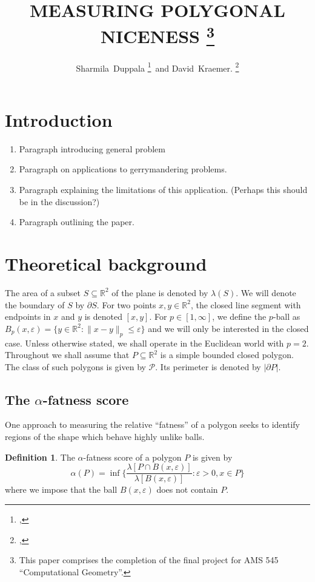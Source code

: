 \documentclass[draft]{jocg}
\title{%
  \MakeUppercase{Measuring polygonal niceness}%
  \thanks{%
    This paper comprises the completion of the final project for AMS 545
    ``Computational Geometry''.
  }
}
\author{%
  Sharmila~Duppala%
  \thanks{%
    \affil{Department of Computer Science}, 
    \email{sduppala@cs.stonybrook.edu}%
  }\, and
  David~Kraemer.%
  \thanks{%
    \affil{Department of Applied Mathematics},
    \email{david.kraemer@stonybrook.edu}%
  }
}
\newcommand{\RR}{\mathbb{R}}
\newcommand{\PP}{\mathcal{P}}
\newcommand{\set}[1]{\{#1\}}
\newcommand{\norm}[1]{\|#1\|}
\newcommand{\abs}[1]{|#1|}
\theoremstyle{definition}
\newtheorem{definition}[proposition]{Definition}
\theoremstyle{remark}
\begin{document}
\maketitle

\begin{abstract}
\end{abstract}

\tableofcontents

\section{Introduction}

\begin{enumerate}
  \item Paragraph introducing general problem
  \item Paragraph on applications to gerrymandering problems.
  \item Paragraph explaining the limitations of this application. (Perhaps this
    should be in the discussion?)
  \item Paragraph outlining the paper.
\end{enumerate}

\section{Theoretical background}

The area of a subset $S \subseteq \RR^2$ of the plane is denoted by
$\lambda(S)$. We will denote the boundary of $S$ by $\partial S$. For two points
$x,y \in \RR^2$, the closed line segment with endpoints in $x$ and $y$ is
denoted $[x,y]$. For $p \in [1, \infty]$, we define the $p$-ball as $B_{p}(x,
\varepsilon) = \set{y \in \RR^2 : \norm{x-y}_p \leq \varepsilon}$ and we will
only be interested in the closed case. Unless otherwise stated, we shall operate
in the Euclidean world with $p = 2$. Throughout we shall assume that $P
\subseteq \RR^2$ is a simple bounded closed polygon. The class of such polygons
is given by $\PP$. Its perimeter is denoted by $\abs{\partial P}$.

\subsection{The $\alpha$-fatness score}

One approach to measuring the relative ``fatness'' of a polygon seeks to
identify regions of the shape which behave highly unlike balls.

\begin{definition}
  The $\alpha$-fatness score of a polygon $P$ is given by
  \begin{equation*}
    \alpha(P) = \inf\set{\frac{\lambda[P \cap B(x,
    \varepsilon)]}{\lambda[B(x,\varepsilon)]} : \varepsilon > 0, x \in P}
  \end{equation*}
  where we impose that the ball $B(x,\varepsilon)$
  does not contain $P$. 
  \label{def:alpha}
\end{definition}
\end{document}
